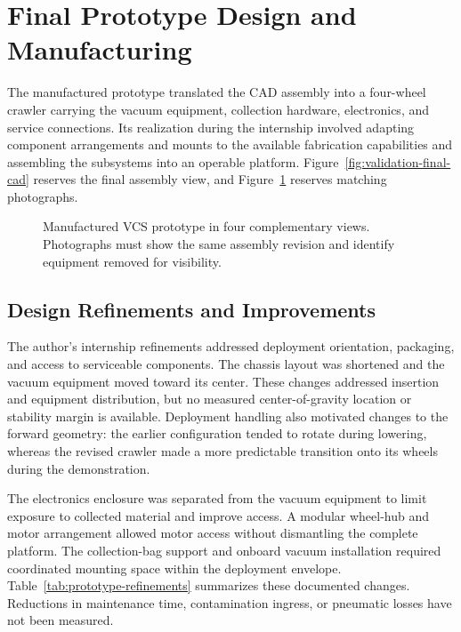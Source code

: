 \section{Final Prototype Design and Manufacturing}
\label{sec:as-built-tests}
The manufactured prototype translated the CAD assembly into a four-wheel crawler carrying the vacuum equipment, collection hardware, electronics, and service connections. Its realization during the internship involved adapting component arrangements and mounts to the available fabrication capabilities and assembling the subsystems into an operable platform. Figure~\ref{fig:validation-final-cad} reserves the final assembly view, and Figure~\ref{fig:validation-prototype-views} reserves matching photographs.

\begin{figure}[htbp]\centering
{}\hfill
{}\par\medskip
{}\hfill
{}
\caption{Manufactured VCS prototype in four complementary views. Photographs must show the same assembly revision and identify equipment removed for visibility.}
\label{fig:validation-prototype-views}
\end{figure}

\subsection{Design Refinements and Improvements}
\label{sec:prototype-refinements}
The author's internship refinements addressed deployment orientation, packaging, and access to serviceable components. The chassis layout was shortened and the vacuum equipment moved toward its center. These changes addressed insertion and equipment distribution, but no measured center-of-gravity location or stability margin is available. Deployment handling also motivated changes to the forward geometry: the earlier configuration tended to rotate during lowering, whereas the revised crawler made a more predictable transition onto its wheels during the demonstration.

The electronics enclosure was separated from the vacuum equipment to limit exposure to collected material and improve access. A modular wheel-hub and motor arrangement allowed motor access without dismantling the complete platform. The collection-bag support and onboard vacuum installation required coordinated mounting space within the deployment envelope. Table~\ref{tab:prototype-refinements} summarizes these documented changes. Reductions in maintenance time, contamination ingress, or pneumatic losses have not been measured.

